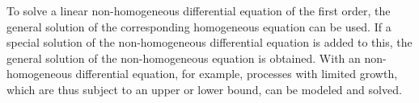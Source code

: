 \documentclass{book}
\begin{document}
To solve a linear non-homogeneous differential equation of the first order, the general solution of the corresponding homogeneous equation can be used. If a special solution of the non-homogeneous differential equation is added to this, the general solution of the non-homogeneous equation is obtained. With an non-homogeneous differential equation, for example, processes with limited growth, which are thus subject to an upper or lower bound, can be modeled and solved.
\end{document}
